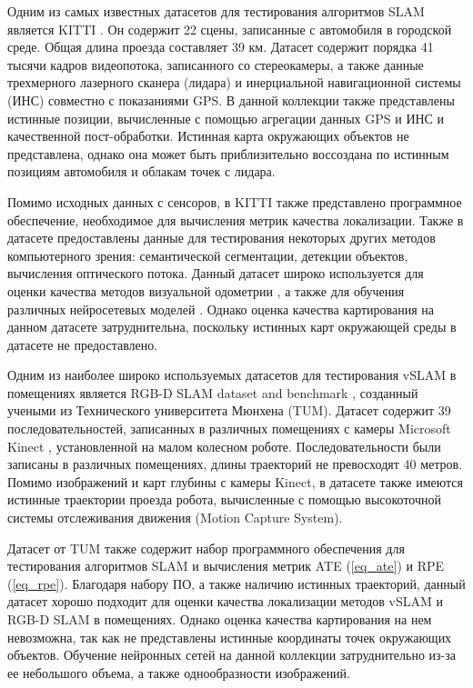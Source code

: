 \documentclass{mipt-thesis-ms}
\begin{document}
	Одним из самых известных датасетов для тестирования алгоритмов SLAM является KITTI \cite{geiger2012we}. Он содержит 22 сцены, записанные с автомобиля в городской среде. Общая длина проезда составляет 39 км. Датасет содержит порядка 41 тысячи кадров видеопотока, записанного со стереокамеры, а также данные трехмерного лазерного сканера (лидара) и инерциальной навигационной системы (ИНС) совместно с показаниями GPS. В данной коллекции также представлены истинные позиции, вычисленные с помощью агрегации данных GPS и ИНС и качественной пост-обработки. Истинная карта окружающих объектов не представлена, однако она может быть приблизительно воссоздана по истинным позициям автомобиля и облакам точек с лидара.
	
	Помимо исходных данных с сенсоров, в KITTI также представлено программное обеспечение, необходимое для вычисления метрик качества локализации. Также в датасете предоставлены данные для тестирования некоторых других методов компьютерного зрения: семантической сегментации, детекции объектов, вычисления оптического потока. Данный датасет широко используется для оценки качества методов визуальной одометрии \cite{geiger2015kitti}, а также для обучения различных нейросетевых моделей \cite{li2018megadepth} \cite{zhou2017unsupervised} \cite{patil2020don}. Однако оценка качества картирования на данном датасете затруднительна, поскольку истинных карт окружающей среды в датасете не предоставлено.
	
	Одним из наиболее широко используемых датасетов для тестирования vSLAM в помещениях является RGB-D SLAM dataset and benchmark \cite{sturm2012benchmark}, созданный учеными из Технического университета Мюнхена (TUM). Датасет содержит 39 последовательностей, записанных в различных помещениях с камеры Microsoft Kinect \cite{zhang2012microsoft}, установленной на малом колесном роботе. Последовательности были записаны в различных помещениях, длины траекторий не превосходят 40 метров. Помимо изображений и карт глубины с камеры Kinect, в датасете также имеются истинные траектории проезда робота, вычисленные с помощью высокоточной системы отслеживания движения (Motion Capture System).
	
	Датасет от TUM также содержит набор программного обеспечения для тестирования алгоритмов SLAM и вычисления метрик ATE (\ref{eq_ate}) и RPE (\ref{eq_rpe}). Благодаря набору ПО, а также наличию истинных траекторий, данный датасет хорошо подходит для оценки качества локализации методов vSLAM и RGB-D SLAM в помещениях. Однако оценка качества картирования на нем невозможна, так как не представлены истинные координаты точек окружающих объектов. Обучение нейронных сетей на данной коллекции затруднительно из-за ее небольшого объема, а также однообразности изображений.
	
\end{document}
